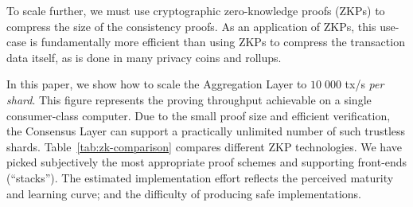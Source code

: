 \documentclass[twocolumn]{article}
\begin{document}
To scale further, we must use cryptographic zero-knowledge proofs (ZKPs) to compress the size of the consistency proofs. As an application of ZKPs, this use-case is fundamentally more efficient than using ZKPs to compress the transaction data itself, as is done in many privacy coins and rollups.

In this paper, we show how to scale the Aggregation Layer to $10\;000$ tx/s \emph{per shard}. This figure represents the proving throughput achievable on a single consumer-class computer. Due to the small proof size and efficient verification, the Consensus Layer can support a practically unlimited number of such trustless shards. Table~\ref{tab:zk-comparison} compares different ZKP technologies. We have picked subjectively the most appropriate proof schemes and supporting front-ends (``stacks''). The estimated implementation effort reflects the perceived maturity and learning curve; and the difficulty of producing safe implementations.
\end{document}
